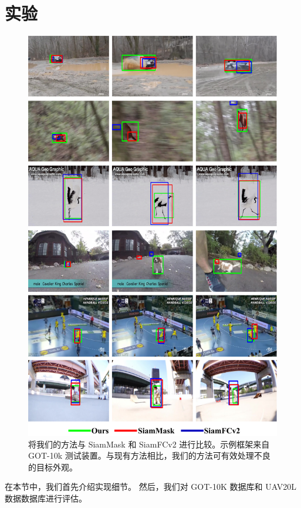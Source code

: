 \section{实验}

\begin{figure}[t]
    \centering
    \includegraphics[width=1.0\textwidth]{Img/end/visulization.pdf}
    \caption{将我们的方法与 SiamMask 和 SiamFCv2 进行比较。示例框架来自 GOT-10k 测试装置。与现有方法相比，我们的方法可有效处理不良的目标外观。}
    \label{fig:visulization}
\end{figure}

在本节中，我们首先介绍实现细节。
然后，我们对 GOT-10K \cite{GOT-10k} 数据库和 UAV20L \cite{mueller2016benchmark} 数据数据库进行评估。
